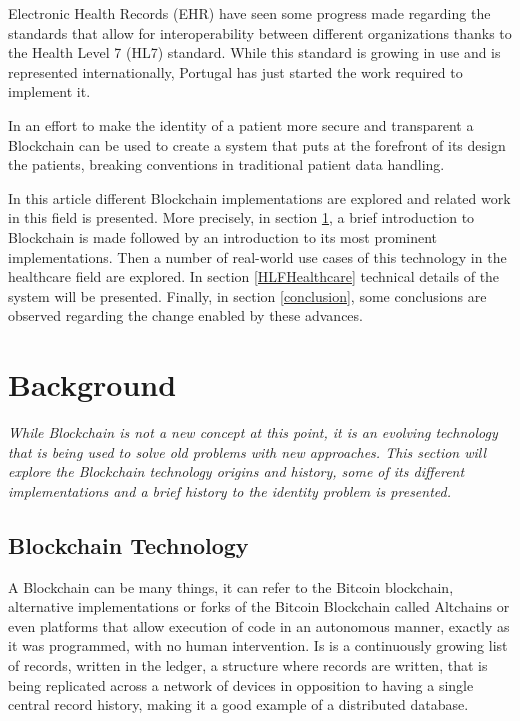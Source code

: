 \documentclass[]{llncs}
\begin{document}
Electronic Health Records (EHR) have seen some progress made regarding the standards that allow for 
interoperability between different organizations thanks to the Health Level 7 (HL7) standard. 
While this standard is growing in use and is represented internationally, Portugal has just started 
the work required to implement it.
\cite{HealthLevel7}

In an effort to make the identity of a patient more secure and transparent a Blockchain can be used to create a 
system that puts at the forefront of its design the patients, breaking conventions in traditional patient data handling.

In this article different Blockchain implementations are explored and related work in this field is presented. 
More precisely, in section \ref{background}, a brief introduction to Blockchain is made followed by an introduction 
to its most prominent implementations. Then a number of real-world use cases of this technology in the healthcare field 
are explored. In section \ref{HLFHealthcare} technical details of the system will be presented. 
Finally, in section \ref{conclusion},  some conclusions are observed regarding the change enabled by these advances.



\section{Background} \label{background}

\textit{While Blockchain is not a new concept at this point, it is an evolving technology that is 
being used to solve old problems with new approaches. This section will explore the Blockchain technology 
origins and history, some of its different implementations and a brief history to the identity problem is presented.}

\subsection{Blockchain Technology}

A Blockchain can be many things, it can refer to the Bitcoin blockchain, alternative implementations 
or forks of the Bitcoin Blockchain called Altchains or even platforms that allow execution of code 
in an autonomous manner, exactly as it was programmed, with no human intervention. 
Is is a continuously growing list of records, written in the ledger, a structure where records are
written, that is being replicated across a network of devices in opposition to having a 
single central record history, making it a good example of a distributed database.
\cite{Wood2017}
  
\end{document}
